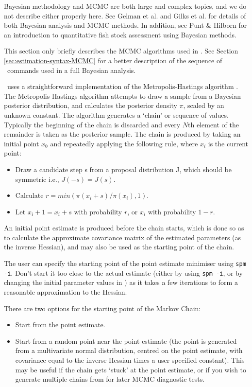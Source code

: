 Bayesian methodology and MCMC are both large and complex topics, and we do not describe either properly here. See Gelman et al. \citeyearpar{823} and Gilks et al. \citeyearpar{143} for details of both Bayesian analysis and MCMC methods. In addition, see Punt \& Hilborn \citeyearpar{828} for an introduction to quantitative fish stock assessment using Bayesian methods. 

This section only briefly describes the MCMC algorithms used in \SPM. See Section \ref{sec:estimation-syntax-MCMC} for a better description of the sequence of \SPM\ commands used in a full Bayesian analysis.

\SPM\ uses a straightforward implementation of the Metropolis-Hastings algorithm \citep{823,143}. The Metropolis-Hastings algorithm attempts to draw a sample from a Bayesian posterior distribution, and calculates the posterior density $\pi$, scaled by an unknown constant. The algorithm generates a `chain' or sequence of values. Typically the beginning of the chain is discarded and every $N$th element of the remainder is taken as the posterior sample. The chain is produced by taking an initial point $x_0$ and repeatedly applying the following rule, where $x_i$ is the current point: 

\begin{itemize}
\item Draw a candidate step s from a proposal distribution J, which should be symmetric i.e., $J(-s)=J(s)$.
\item Calculate $r=min(\pi(x_i+s)/\pi(x_i),1)$. 
\item Let $x_i+1=x_i+s$ with probability $r$, or $x_i$ with probability $1-r$.
\end{itemize}

An initial point estimate is produced before the chain starts, which is done so as to calculate the approximate covariance matrix of the estimated parameters (as the inverse Hessian), and may also be used as the starting point of the chain. 

The user can specify the starting point of the point estimate minimiser using \texttt{spm -i}. Don't start it too close to the actual estimate (either by using \texttt{spm -i}, or by changing the initial parameter values in \config) as it takes a few iterations to form a reasonable approximation to the Hessian. 

There are two options for the starting point of the Markov Chain: 

\begin{itemize}
\item Start from the point estimate.
\item Start from a random point near the point estimate (the point is generated from a multivariate normal distribution, centred on the point estimate, with covariance equal to the inverse Hessian times a user-specified constant). This may be useful if the chain gets `stuck' at the point estimate, or if you wish to generate multiple chains from  for later MCMC diagnostic tests.
\end{itemize}

